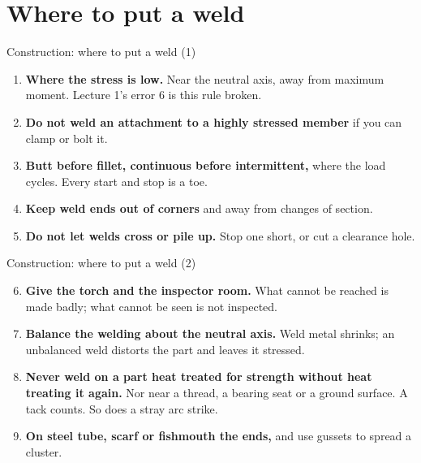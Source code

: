 \documentclass[aspectratio=169,10pt]{beamer}
\begin{document}
\section{Where to put a weld}

\begin{frame}{Construction: where to put a weld (1)}
\begin{enumerate}
  \item \textbf{Where the stress is low.} Near the neutral axis, away from maximum moment.
        Lecture 1's error 6 is this rule broken.
  \item \textbf{Do not weld an attachment to a highly stressed member} if you can clamp or bolt it.
  \item \textbf{Butt before fillet, continuous before intermittent,} where the load cycles. Every
        start and stop is a toe.
  \item \textbf{Keep weld ends out of corners} and away from changes of section.
  \item \textbf{Do not let welds cross or pile up.} Stop one short, or cut a clearance hole.
\end{enumerate}
\end{frame}

\begin{frame}{Construction: where to put a weld (2)}
\begin{enumerate}\setcounter{enumi}{5}
  \item \textbf{Give the torch and the inspector room.} What cannot be reached is made badly; what
        cannot be seen is not inspected.
  \item \textbf{Balance the welding about the neutral axis.} Weld metal shrinks; an unbalanced weld
        distorts the part and leaves it stressed.
  \item \textbf{Never weld on a part heat treated for strength without heat treating it again.} Nor
        near a thread, a bearing seat or a ground surface. A tack counts. So does a
        \alert{stray arc strike}.
  \item \textbf{On steel tube, scarf or fishmouth the ends,} and use gussets to spread a cluster.
\end{enumerate}
\end{frame}
\end{document}
